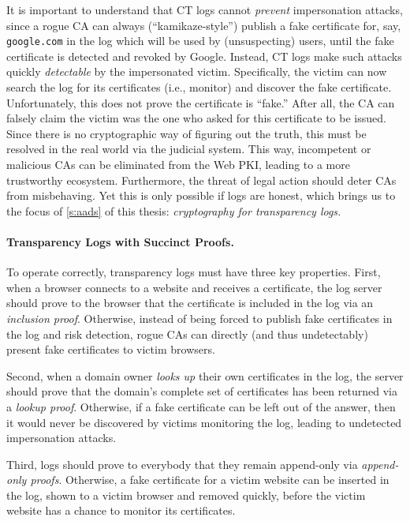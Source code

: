 It is important to understand that CT logs cannot \textit{prevent} impersonation attacks, since a rogue CA can always (``kamikaze-style'') publish a fake certificate for, say, \texttt{google.com} in the log which will be used by (unsuspecting) users, until the fake certificate is detected and revoked by Google.
Instead, CT logs make such attacks quickly \textit{detectable} by the impersonated victim.
Specifically, the victim can now search the log for its certificates (i.e., monitor) and discover the fake certificate.
Unfortunately, this does not prove the certificate is ``fake.''
After all, the CA can falsely claim the victim was the one who asked for this certificate to be issued.
Since there is no cryptographic way of figuring out the truth, this must be resolved in the real world via the judicial system.
This way, incompetent or malicious CAs can be eliminated from the Web PKI, leading to a more trustworthy ecosystem.
Furthermore, the threat of legal action should deter CAs from misbehaving.
Yet this is only possible if logs are honest, which brings us to the focus of \cref{s:aads} of this thesis: \textit{cryptography for transparency logs.}

\paragraph{Transparency Logs with Succinct Proofs.}
To operate correctly, transparency logs must have three key properties.
First, when a browser connects to a website and receives a certificate, the log server should prove to the browser that the certificate is included in the log via an \textit{inclusion proof}.
Otherwise, instead of being forced to publish fake certificates in the log and risk detection, rogue CAs can directly (and thus undetectably) present fake certificates to victim browsers.

Second, when a domain owner \textit{looks up} their own certificates in the log, the server should prove that the domain's complete set of certificates has been returned via a \textit{lookup proof}.
Otherwise, if a fake certificate can be left out of the answer, then it would never be discovered by victims monitoring the log, leading to undetected impersonation attacks.

Third, logs should prove to everybody that they remain append-only via \textit{append-only proofs}.
Otherwise, a fake certificate for a victim website can be inserted in the log, shown to a victim browser and removed quickly, before the victim website has a chance to monitor its certificates.


